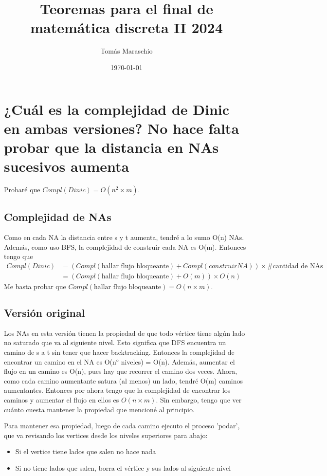 \documentclass[11pt]{article}
\author{Tomás Maraschio}
\date{\today}
\title{Teoremas para el final de matemática discreta II 2024}
\begin{document}
\maketitle
\setcounter{tocdepth}{1}
\tableofcontents


\section{¿Cuál es la complejidad de Dinic en ambas versiones? No hace falta probar que la distancia en NAs sucesivos aumenta}
\label{sec:org75dc452}
Probaré que \(Compl(Dinic) = O(n^2 \times m)\).
\subsection{Complejidad de NAs}
\label{sec:org7946bfb}
Como en cada NA la distancia entre s y t aumenta, tendré a lo sumo O(n) NAs. Además, como uso BFS, la complejidad de construir cada NA es O(m).
Entonces tengo que
\begin{align*}
Compl(Dinic) & = (Compl(\text{hallar flujo bloqueante}) + Compl(construir NA)) \times \# \text{cantidad de NAs} \\
& = (Compl(\text{hallar flujo bloqueante}) + O(m)) \times O(n)
\end{align*}
Me basta probar que \(Compl(\text{hallar flujo bloqueante}) = O(n \times m)\).

\subsection{Versión original}
\label{sec:org5b3ac1b}
Los NAs en esta versión tienen la propiedad de que todo vértice tiene algún lado no saturado que va al siguiente nivel. Esto significa que DFS encuentra un camino de s a t sin tener que hacer backtracking. Entonces la complejidad de encontrar un camino en el NA es O(n° niveles) = O(n). Además, aumentar el flujo en un camino es O(n), pues hay que recorrer el camino dos veces. Ahora, como cada camino aumentante satura (al menos) un lado, tendré O(m) caminos aumentantes.
Entonces por ahora tengo que la complejidad de encontrar los caminos y aumentar el flujo en ellos es \({O(n \times m)}\). Sin embargo, tengo que ver cuánto cuesta mantener la propiedad que mencioné al principio.

Para mantener esa propiedad, luego de cada camino ejecuto el proceso 'podar', que va revisando los vertices desde los niveles superiores para abajo:
\begin{itemize}
\item Si el vertice tiene lados que salen no hace nada
\item Si no tiene lados que salen, borra el vértice y sus lados al siguiente nivel
\end{itemize}
\end{document}
